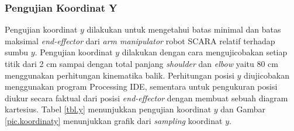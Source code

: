 \subsubsection{Pengujian Koordinat Y}
Pengujian koordinat $y$ dilakukan untuk mengetahui batas minimal dan batas maksimal \textit{end-effector} dari \textit{arm manipulator} robot SCARA relatif terhadap sumbu $y$. Pengujian koordinat $y$ dilakukan dengan cara mengujicobakan setiap titik dari 2 cm sampai dengan total panjang \textit{shoulder} dan \textit{elbow} yaitu 80 cm menggunakan perhitungan kinematika balik. Perhitungan posisi $y$ diujicobakan menggunakan program Processing IDE, sementara untuk pengukuran posisi diukur secara faktual dari posisi \textit{end-effector} dengan membuat sebuah diagram kartesius. Tabel \ref{tbl.y} menunjukkan pengujian koordinat $y$ dan Gambar \ref{pic.koordinaty} menunjukkan grafik dari \textit{sampling} koordinat $y$.
